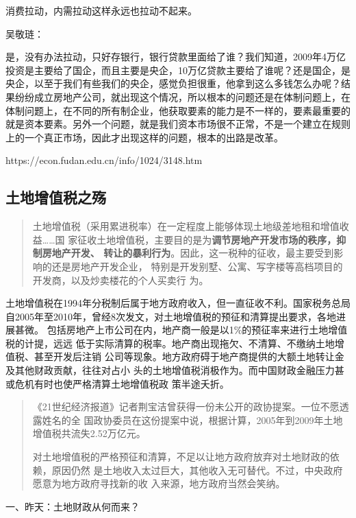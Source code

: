 消费拉动，内需拉动这样永远也拉动不起来。

吴敬琏：

是，没有办法拉动，只好存银行，银行贷款里面给了谁？我们知道，2009年4万亿投资是主要给了国企，而且主要是央企，10万亿贷款主要给了谁呢？还是国企，是央企，以至于我们有些我们的央企，感觉负担很重，他拿到这么多钱怎么办呢？结果纷纷成立房地产公司，就出现这个情况，所以根本的问题还是在体制问题上，在体制问题上，在不同的所有制企业，他获取要素的能力是不一样的，要素最重要的就是资本要素。另外一个问题，就是我们资本市场很不正常，不是一个建立在规则上的一个真正市场，因此才出现这样的问题，根本的出路是改革。

https://econ.fudan.edu.cn/info/1024/3148.htm
\subsection{土地增值税之殇}

\begin{quotation}
  土地增值税（采用累进税率）在一定程度上能够体现土地级差地租和增值收益……国
  家征收土地增值税，主要目的是为\textbf{调节房地产开发市场的秩序，抑制房地产开发、
    转让的暴利行为}。因此，这一税种的征收，最主要受到影响的还是房地产开发企业，
  特别是开发别墅、公寓、写字楼等高档项目的开发商，以及炒卖楼花的个人买卖行
  为。\cite{yangdi}
\end{quotation}

土地增值税在1994年分税制后属于地方政府收入，但一直征收不利。国家税务总局
自2005年至2010年，曾经8次发文，对土地增值税的预征和清算提出要求，各地进展甚微。
包括房地产上市公司在内，地产商一般是以1\%的预征率来进行土地增值税的计提，远远
低于实际清算的税率。地产商出现拖欠、不清算、不缴纳土地增值税、甚至开发后注销
公司等现象。地方政府碍于地产商提供的大额土地转让金及其他财政贡献，往往对占小
头的土地增值税消极作为。而中国财政金融压力甚或危机有时也使严格清算土地增值税政
策半途夭折。

\begin{quotation}
《21世纪经济报道》记者荆宝洁曾获得一份未公开的政协提案。一位不愿透露姓名的全
国政协委员在这份提案中说，根据计算，2005年到2009年土地增值税共流失2.52万亿元。

对土地增值税的严格预征和清算，不足以让地方政府放弃对土地财政的依赖，原因仍然
是土地收入太过巨大，其他收入无可替代。不过，中央政府愿意为地方政府寻找新的收
入来源，地方政府当然会笑纳。\cite{2011feiteng}
\end{quotation}






 一、昨天：土地财政从何而来？

